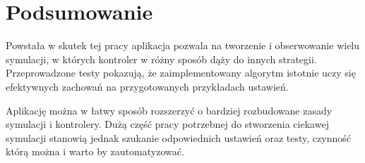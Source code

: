 \chapter{Podsumowanie}
Powstała w skutek tej pracy aplikacja pozwala na tworzenie i obserwowanie wielu symulacji, w których kontroler w różny sposób dąży do innych strategii. Przeprowadzone testy pokazują, że zaimplementowany algorytm istotnie uczy się efektywnych zachowań na przygotowanych przykładach ustawień.

Aplikację można w łatwy sposób rozszerzyć o bardziej rozbudowane zasady symulacji i kontrolery. Dużą część pracy potrzebnej do stworzenia ciekawej symulacji stanowią jednak szukanie odpowiednich ustawień oraz testy, czynność którą można i warto by zautomatyzować.
